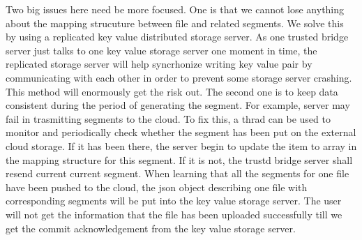 Two big issues here need be more focused. One is that we cannot lose anything about the mapping strucuture between file and related segments. We solve this by using a replicated key value distributed storage server. As one trusted bridge server just talks to one key value storage server one moment in time, the replicated storage server will help syncrhonize writing key value pair by communicating with each other in order to prevent some storage server crashing. This method will enormously get the risk out. 
The second one is to keep data consistent during the period of generating the segment. For example, server may fail in trasmitting segments to the cloud. To fix this, a thrad can be used to monitor and periodically check whether the segment has been put on the external cloud storage. If it has been there, the server begin to update the item to array in the mapping structure for this segment. If it is not, the trustd bridge server shall resend current current segment. When learning that all the segments for one file have been pushed to the cloud, the json object describing one file with corresponding segments will be put into the key value storage server. The user will not get the information that the file has been uploaded successfully till we get the commit acknowledgement from the key value storage server.
